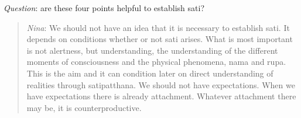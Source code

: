 \documentclass[10pt,a4paper,oneside]{article}
\begin{document}
\textit{Question}: are these four points helpful to establish sati?

\begin{quote}

\textit{Nina}: We should not have an idea that it is necessary to establish sati. It depends on conditions whether or not sati arises. What is most important is not alertness, but understanding, the understanding of the different moments of consciousness and the physical phenomena, nama and rupa. This is the aim and it can condition later on direct understanding of realities through satipatthana. We should not have expectations. When we have expectations there is already attachment. Whatever attachment there may be, it is counterproductive. 
\end{quote}
\end{document}
